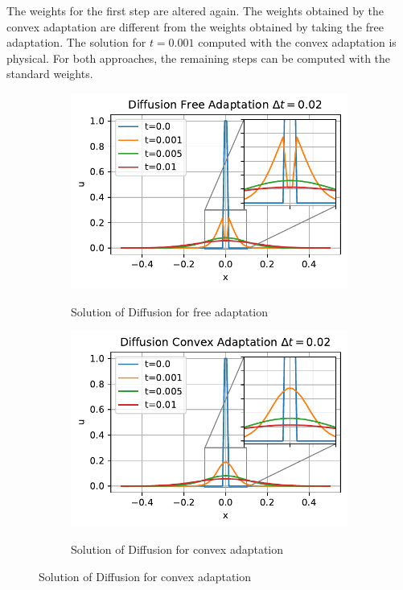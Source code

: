 \documentclass[a4paper]{article}
\numberwithin{equation}{section}
\theoremstyle{plain}
\theoremstyle{definition}
\numberwithin{theorem}{section}
\newcommand{\1}{\mathbbm{1}}
\begin{document}
The weights for the first step are altered again. 
The weights obtained by the convex adaptation are different from the weights obtained 
by taking the free adaptation. 
The solution for $t=0.001$ computed with the convex adaptation is physical. 
For both approaches, the remaining steps can be computed with the standard weights. 
\begin{figure}
\centering
\begin{subfigure}[b]{0.45\textwidth}
\includegraphics[width=1\textwidth]{plots/Diff_Direct.pdf}\\
\caption{Solution of Diffusion for free adaptation \newline $ $}
\label{fig:sol_Diff_a}
\end{subfigure}
\begin{subfigure}[b]{0.45\textwidth}
\includegraphics[width=1\textwidth]{plots/Diff_Convex.pdf}\\
\caption{Solution of Diffusion for convex adaptation}
\label{fig:sol_Diff_c}
\end{subfigure}


\end{figure}
\end{document}
